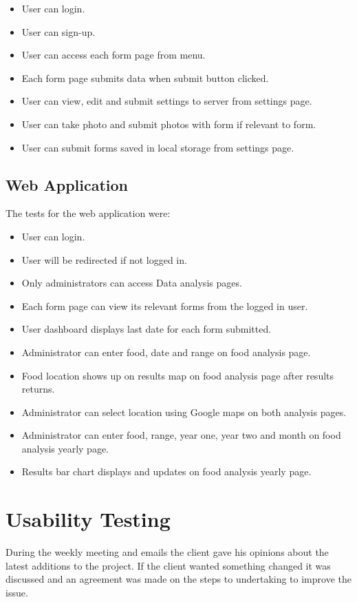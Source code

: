 \begin{itemize}
\item User can login.
\item User can sign-up.
\item User can access each form page from menu.
\item Each form page submits data when submit button clicked.
\item User can view, edit and submit settings to server from settings page.
\item User can take photo and submit photos with form if relevant to form.
\item User can submit forms saved in local storage from settings page.
\end{itemize}

\subsection{Web Application}
The tests for the web application were:

\begin{itemize}
\item User can login.
\item User will be redirected if not logged in.
\item Only administrators can access Data analysis pages.
\item Each form page can view its relevant forms from the logged in user.
\item User dashboard displays last date for each form submitted.
\item Administrator can enter food, date and range on food analysis page.
\item Food location shows up on results map on food analysis page after results returns.
\item Administrator can select location using Google maps on both analysis pages.
\item Administrator can enter food, range, year one, year two and month on food analysis yearly page.
\item Results bar chart displays and updates on food analysis yearly page.
\end{itemize}

\section{Usability Testing}
During the weekly meeting and emails the client gave his opinions about the latest additions to the project. If the client wanted something changed it was discussed and an agreement was made on the steps to undertaking to improve the issue.

